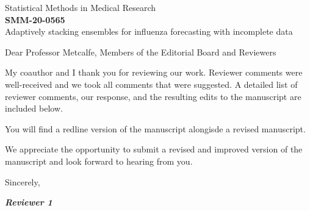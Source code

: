 \documentclass[
  fontsize=11pt,
  paper=a4,
  parskip=half,
  enlargefirstpage=on,    %
  fromalign=right,        %
  fromphone=on,           %
  fromrule=aftername,     %
  addrfield=on,           %
  backaddress=on,         %
  subject=beforeopening,  %
  locfield=narrow,        %
  foldmarks=on,           %
]{scrlttr2}
\def \journal {Statistical Methods in Medical Research}
\def \paperTitle {Adaptively stacking ensembles for influenza forecasting with incomplete data}
\def \paperNumber {SMM-20-0565}
\newcommand{\rv}[1]{\textit{\textbf{Reviewer #1}}}
\begin{document}
  \begin{letter}{\journal\\ \textbf{\paperNumber} \\ \paperTitle}
    \opening{Dear Professor Metcalfe, Members of the Editorial Board and Reviewers}

    My coauthor and I thank you for reviewing our work.
    Reviewer comments were well-received and we took all comments that were suggested.
    A detailed list of reviewer comments, our response, and the resulting edits to the manuscript are included below.
    
    You will find a redline version of the manuscript alongisde a revised manuscript.  

    We appreciate the opportunity to submit a revised and improved version of the manuscript and look forward to hearing from you.
    
    \closing{Sincerely,}
  \end{letter}
  
    \rv{1}
\end{document}
